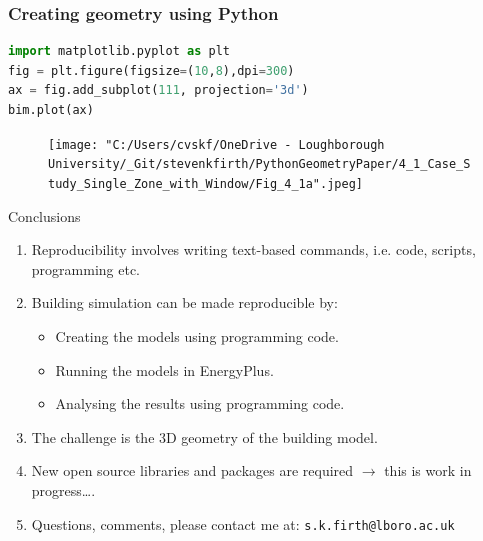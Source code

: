 \documentclass{beamer}
\begin{document}
	\begin{frame}[fragile]
		\frametitle{Creating geometry using Python}
		\footnotesize
		\begin{lstlisting}[language=Python]
import matplotlib.pyplot as plt
fig = plt.figure(figsize=(10,8),dpi=300)
ax = fig.add_subplot(111, projection='3d')
bim.plot(ax)
		\end{lstlisting}
		\begin{figure}
			\texttt{[image: "C:/Users/cvskf/OneDrive - Loughborough University/\_Git/stevenkfirth/PythonGeometryPaper/4\_1\_Case\_Study\_Single\_Zone\_with\_Window/Fig\_4\_1a".jpeg]}
		\end{figure}
	\end{frame}


	\begin{frame}{Conclusions}
		\begin{enumerate}
			\item Reproducibility involves writing text-based commands, i.e. code, scripts, programming etc.\\[10pt]
			\item Building simulation can be made reproducible by:
			\begin{itemize}
				\item Creating the models using programming code.
				\item Running the models in EnergyPlus.
				\item Analysing the results using programming code.\\[10pt]
			\end{itemize} 
			\item The challenge is the 3D geometry of the building model. \\[10pt]
			\item New open source libraries and packages are required $\rightarrow$ this is work in progress\ldots.\\[10pt]
			\item Questions, comments, please contact me at: \texttt{s.k.firth@lboro.ac.uk}
		\end{enumerate}
	\end{frame}
\end{document}
